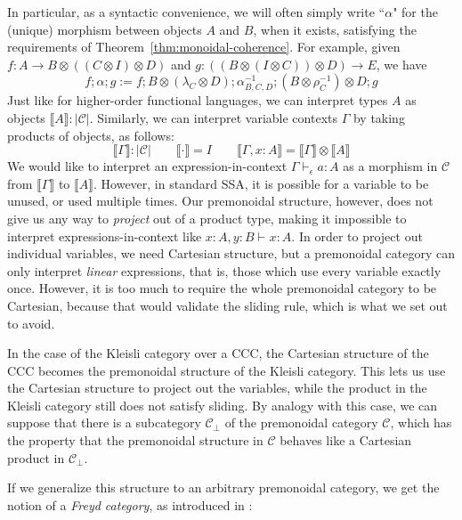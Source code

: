 \documentclass[acmsmall,screen,review]{acmart}
\newcommand{\mc}[1]{\ensuremath{\mathcal{#1}}}
\newcommand{\bhyp}[2]{#1 : #2}
\newcommand{\hasty}[4]{#1 \vdash_{#2} #3: {#4}}
\newcommand{\dnt}[1]{\llbracket{#1}\rrbracket}
\begin{document}
In particular, as a syntactic convenience, we will often simply write ``$\alpha$" for the (unique)
morphism between objects $A$ and $B$, when it exists, satisfying the requirements of
Theorem~\ref{thm:monoidal-coherence}. For example, given $f : A \to B \otimes ((C \otimes I)
\otimes D)$ and $g : ((B \otimes (I \otimes C)) \otimes D) \to E$, we have
$$
f;\alpha;g := 
  f ; 
  B \otimes (\lambda_C \otimes D) ; 
  \alpha_{B, C, D}^{-1} ; 
  (B \otimes \rho_C^{-1}) \otimes D ;
  g 
$$
Just like for higher-order functional languages, we can interpret types $A$ as objects $\dnt{A} :
|\mc{C}|$. Similarly, we can interpret variable contexts $\Gamma$ by taking products of objects, as
follows:
$$
\boxed{\dnt{\Gamma} : |\mc{C}|} \qquad 
  \dnt{\cdot} = I \qquad \dnt{\Gamma, \bhyp{x}{A}} = \dnt{\Gamma} \otimes \dnt{A}
$$
We would like to interpret an expression-in-context $\hasty{\Gamma}{\epsilon}{a}{A}$ as a morphism in
$\mc{C}$ from $\dnt{\Gamma}$ to $\dnt{A}$. However, in standard SSA, it is possible for a variable
to be unused, or used multiple times. Our premonoidal structure, however, does not give us any way
to \emph{project} out of a product type, making it impossible to interpret expressions-in-context
like
$
\hasty{\bhyp{x}{A}, \bhyp{y}{B}}{}{x}{A}
$. 
In order to project out individual variables, we need Cartesian structure, but a premonoidal
category can only interpret \emph{linear} expressions, that is, those which use every variable
exactly once. However, it is too much to require the whole premonoidal category to be Cartesian,
because that would validate the sliding rule, which is what we set out to avoid.

In the case of the Kleisli category over a CCC, the Cartesian structure of the CCC becomes the
premonoidal structure of the Kleisli category. This lets us use the Cartesian structure to project
out the variables, while the product in the Kleisli category still does not satisfy sliding. By
analogy with this case, we can suppose that there is a subcategory $\mc{C}_\bot$ of the premonoidal
category $\mc{C}$, which has the property that the premonoidal structure in $\mc{C}$ behaves like a
Cartesian product in $\mc{C}_\bot$. 

If we generalize this structure to an arbitrary premonoidal category, we get the notion of a
\emph{Freyd category}, as introduced in \citet{levy-03-environment}:
\end{document}
